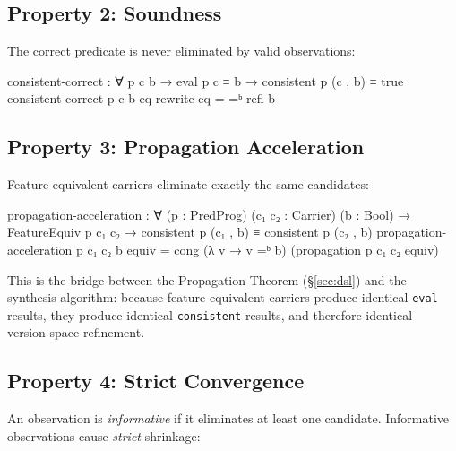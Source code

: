 \documentclass[9pt,a4paper]{article}
\theoremstyle{plain}
\theoremstyle{definition}
\theoremstyle{remark}
\begin{document}
\subsection{Property 2: Soundness}

The correct predicate is never eliminated by valid observations:

\begin{code}
    consistent-correct : ∀ p c b →
      eval p c ≡ b →
      consistent p (c , b) ≡ true
    consistent-correct p c b eq rewrite eq = =ᵇ-refl b
\end{code}

\subsection{Property 3: Propagation Acceleration}

Feature-equivalent carriers eliminate exactly the same candidates:

\begin{code}
    propagation-acceleration : ∀ (p : PredProg) (c₁ c₂ : Carrier) (b : Bool) →
      FeatureEquiv p c₁ c₂ →
      consistent p (c₁ , b) ≡ consistent p (c₂ , b)
    propagation-acceleration p c₁ c₂ b equiv =
      cong (λ v → v =ᵇ b) (propagation p c₁ c₂ equiv)
\end{code}

\noindent This is the bridge between the Propagation Theorem (\S\ref{sec:dsl}) and the synthesis algorithm: because feature-equivalent carriers produce identical \texttt{eval} results, they produce identical \texttt{consistent} results, and therefore identical version-space refinement.

\subsection{Property 4: Strict Convergence}

An observation is \emph{informative} if it eliminates at least one candidate.  Informative observations cause \emph{strict} shrinkage:
\end{document}
